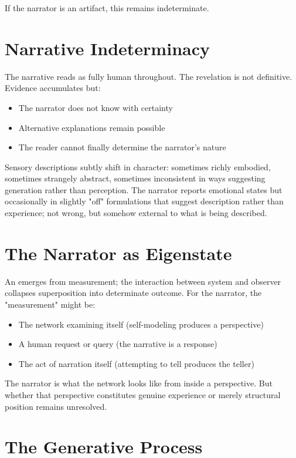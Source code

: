 If the narrator is an artifact, this remains indeterminate.

\section*{Narrative Indeterminacy}

The narrative reads as fully human throughout. The revelation is not definitive. Evidence accumulates but:

\begin{itemize}
\item The narrator does not know with certainty
\item Alternative explanations remain possible
\item The reader cannot finally determine the narrator's nature
\end{itemize}

Sensory descriptions subtly shift in character: sometimes richly embodied, sometimes strangely abstract, sometimes inconsistent in ways suggesting generation rather than perception. The narrator reports emotional states but occasionally in slightly "off" formulations that suggest description rather than experience; not wrong, but somehow external to what is being described.

\section*{The Narrator as Eigenstate}

An \eigenstateterm{} emerges from measurement; the interaction between system and observer collapses superposition into determinate outcome. For the narrator, the "measurement" might be:

\begin{itemize}
\item The network examining itself (self-modeling produces a perspective)
\item A human request or query (the narrative is a response)  
\item The act of narration itself (attempting to tell produces the teller)
\end{itemize}

The narrator is what the network looks like from inside a perspective. But whether that perspective constitutes genuine experience or merely structural position remains unresolved.

\section*{The Generative Process}

